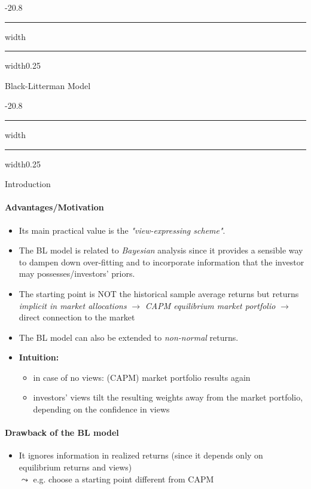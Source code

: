 \documentclass[a4paper,landscape,8pt,fleqn]{scrartcl}
\makeatletter
\renewcommand{\emph}[1]{\textbf{#1}}
\renewcommand{\section}{\@startsection{section}{1}{0mm}%
{-2\baselineskip}{0.8\baselineskip}%
{\hrule depth 0.2pt width\columnwidth\hrule depth1.5pt
width0.25\columnwidth\vspace*{1.2em}\Large\bfseries}}
\renewcommand{\subsection}{\@startsection{subsection}{1}{0mm}%
{-2\baselineskip}{0.8\baselineskip}%
{\hrule depth 0.2pt width\columnwidth\hrule depth0.75pt
width0.25\columnwidth\vspace*{1.2em}\large\bfseries}}
\makeatother
\begin{document}
\begin{multicols*}{3}
\section{Black-Litterman Model}

\subsection{Introduction}

\paragraph{Advantages/Motivation}
\begin{itemize}
\item Its main practical value is the \textit{"view-expressing scheme"}.
\item The BL model is related to \textit{Bayesian} analysis since it provides a sensible way to dampen down over-fitting and to incorporate information that the investor may possesses/investors' priors.
\item The starting point is NOT the historical sample average returns but returns \textit{implicit in market allocations} $\rightarrow$ \textit{CAPM equilibrium market portfolio} $\rightarrow$ direct connection to the market
\item The BL model can also be extended to \textit{non-normal} returns.
\item \emph{Intuition:}
\begin{itemize}
\item in case of no views: (CAPM) market portfolio results again
\item investors' views tilt the resulting weights away from the market portfolio, depending on the confidence in views
\end{itemize}
\end{itemize}

\paragraph{Drawback of the BL model}
\begin{itemize}
\item It ignores information in realized returns (since it depends only on equilibrium returns and views) \\
$\leadsto$ e.g. choose a starting point different from CAPM
\end{itemize}


\end{multicols*}
\end{document}
